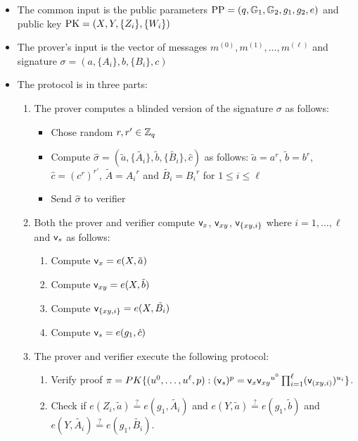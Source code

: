 \documentclass[11pt]{report}
\begin{document}
\begin{itemize}
\item The common input is the public parameters $\mathrm{PP} = (q, \mathbb{G}_1, \mathbb{G}_2, g_1, g_2, e)$ and public key $\mathrm{PK} = (X, Y, \{Z_i\}, \{W_i\})$
\item The prover's input is the vector of messages $m^{(0)}, m^{(1)}, \dots, m^{(\ell)}$ and signature $\sigma = (a, \{A_i\}, b, \{B_i\}, c)$
\item The protocol is in three parts:
\begin{enumerate}
\item The prover computes a blinded version of the signature $\sigma$ as follows:
\begin{itemize}
\item Chose random $r, r' \in \mathbb{Z}_q$
\item Compute $\hat{\sigma} = (\tilde{a}, \{\tilde{A_i}\}, \tilde{b}, \{ \tilde{B_i} \}, \hat{c})$ as follows: $\tilde{a} = a^r$, $\tilde{b} = b^r$, $\hat{c} = ({c^r})^{r'}$, $\tilde{A} = {A_i}^r$ and $\tilde{B_i}= {B_i}^r$ for $1 \le i \le \ell$
\item Send $\hat{\sigma}$ to verifier
\end{itemize}

\item Both the prover and verifier compute ${\sf v}_x$, ${\sf v}_{xy}$, ${\sf v}_{\{xy,i\}}$  where $i = 1, \dots, \ell$ and ${\sf v}_s$ as follows:
\begin{enumerate}
\item Compute ${\sf v}_x = e(X, \tilde{a})$
\item Compute ${\sf v}_{xy} = e(X, \tilde{b})$
\item Compute ${\sf v}_{\{xy,i\}} = e(X, \tilde{B_i})$
\item Compute ${\sf v}_s = e(g_1, \hat{c})$
\end{enumerate}

\item The prover and verifier execute the following protocol:
\begin{enumerate}
\item Verify proof $\pi = PK\{(u^0, \dots, u^\ell, p) : ({{\sf v}_s})^p = {{\sf v}_x} {{\sf v}_{xy}}^{u^0}  \prod_{i=1}^\ell ({\sf v}_{(xy,i)})^{u_i}\}$.
\item Check if $e(Z_i, \tilde{a}) \stackrel{?}{=} e(g_1, \tilde{A_i})$ and $e(Y, \tilde{a}) \stackrel{?}{=} e(g_1, \tilde{b})$ and $e(Y, \tilde{A_i}) \stackrel{?}{=} e(g_1, \tilde{B_i})$.
\end{enumerate}

\end{enumerate}
\end{itemize}
\end{document}
